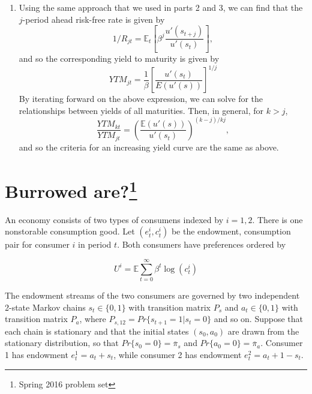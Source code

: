 \documentclass{article}
\newcommand{\E}{\mathbb{E}}
\begin{document}
{\begin{enumerate}
\item Using the same approach that we used in parts 2 and 3, we can find
that the $j$-period ahead risk-free rate is given by
\begin{equation*}
1/R_{jt}=\mathbb{E}_{t}\left[\beta^{j}\frac{u'(s_{t+j})}{u'(s_{t})}\right],
\end{equation*}
and so the corresponding yield to maturity is given by
\begin{equation*}
YTM_{jt}=\frac{1}{\beta}\left[\frac{u'(s_{t})}{E(u'(s))}\right]^{1/j}
\end{equation*}
By iterating forward on the above expression, we can solve for the
relationships between yields of all maturities. Then, in general,
for $k>j$, 
\begin{equation*}
\frac{YTM_{kt}}{YTM_{jt}}=\left(\frac{\mathbb{E}(u'(s))}{u'(s_{t})}\right)^{(k-j)/kj},
\end{equation*}
and so the criteria for an increasing yield curve are the same as
above.

\end{enumerate}

}


\newpage

\section[]{Burrowed are?\footnote{Spring 2016 problem set}}

An economy consists of two types of consumens indexed by
$i=1,2$. There is one nonstorable consumption good. Let
$(e_t^i,c_t^i)$ be the endowment, consumption pair for consumer $i$ in
period $t$. Both consumers have preferences ordered by

\begin{equation*}
  U^i=\E\sum_{t=0}^\infty\beta^t\log(c_t^i)
\end{equation*}

The endowment streams of the two consumers are governed by two
independent 2-state Markov chains $s_t\in\{0,1\}$ with transition
matrix $P_s$ and $a_t\in\{0,1\}$ with transition matrix $P_a$, where
$P_{s,12}=Pr\{s_{t+1}=1|s_t=0\}$ and so on. Suppose that each chain is
stationary and that the initial states $(s_0,a_0)$ are drawn from the
stationary distribution, so that $Pr\{s_0=0\}=\overline{\pi}_s$ and
$Pr\{a_0=0\}=\overline{\pi}_a$. Consumer 1 has endowment
$e_t^1=a_t+s_t$, while consumer 2 has endowment $e_t^2=a_t+1-s_t$.
\end{document}
